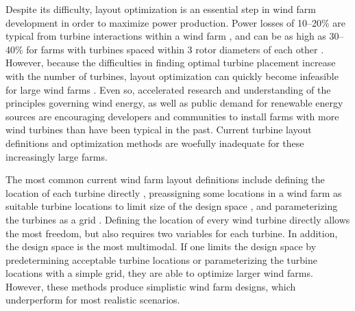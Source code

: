 \documentclass[wes, manuscript]{copernicus}
\begin{document}
Despite its difficulty, layout optimization is an essential step in wind farm development in order to maximize power production. Power losses of 10--20\% are typical from turbine interactions within a wind farm \citep{barthelmie2007modelling,barthelmie2009modelling,briggs2013navigating}, and can be as high as 30--40\% for farms with turbines spaced within 3 rotor diameters of each other \citep{Stanley2017c}. 
However, because the difficulties in finding optimal turbine placement increase with the number of turbines, layout optimization can quickly become infeasible for large wind farms \citep{Ning2016a}. Even so, accelerated research and understanding of the principles governing wind energy, as well as public demand for renewable energy sources are encouraging developers and communities to install farms with more wind turbines than have been typical in the past. Current turbine layout definitions and optimization methods are woefully inadequate for these increasingly large farms. 



The most common current wind farm layout definitions include defining the location of each turbine directly \citep{feng2015solving,guirguis2016toward,Gebraad2017}, preassigning some locations in a wind farm as suitable turbine locations to limit size of the design space \citep{emami2010new,parada2017wind,ju2019wind}, and parameterizing the turbines as a grid \citep{neubert2010maximum,gonzalez2017optimal,perez2018multidisciplinary}. Defining the location of every wind turbine directly allows the most freedom, but also requires two variables for each turbine. In addition, the design space is the most multimodal. 
%
%
If one limits the design space by predetermining acceptable turbine locations or parameterizing the turbine locations with a simple grid, they are able to optimize larger wind farms. However, these methods produce simplistic wind farm designs, which underperform for most realistic scenarios.
\end{document}
